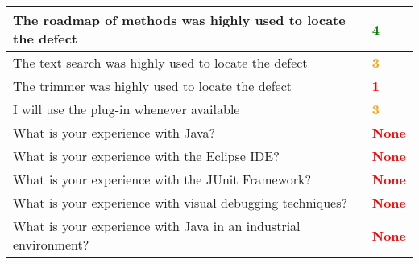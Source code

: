 \begin{table}
\begin{tabular}{m{11cm} | l}
    The roadmap of methods was highly used to locate the defect &
    \textbf{\textcolor{green}{4}} \\ \hline The text search was highly used to locate the defect & \textbf{\textcolor{orange}{3}} \\ \hline
    The trimmer was highly used to locate the defect & \textbf{\textcolor{red}{1}} \\ \hline
    I will use the plug-in whenever available & \textbf{\textcolor{orange}{3}} \\ \hline
    What is your experience with Java? & \textbf{\textcolor{red}{None}} \\ \hline
    What is your experience with the Eclipse IDE? & \textbf{\textcolor{red}{None}} \\ \hline
    What is your experience with the JUnit Framework? & \textbf{\textcolor{red}{None}} \\ \hline
    What is your experience with visual debugging techniques? & \textbf{\textcolor{red}{None}} \\ \hline
    What is your experience with Java in an industrial environment? & \textbf{\textcolor{red}{None}} \\
    \hline
\end{tabular}
\label{tab:experiment_1_answers}
\end{table}

